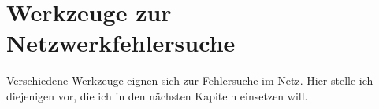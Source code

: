 \chapter{Werkzeuge zur Netzwerkfehlersuche}
\label{cha:netz-werkzeuge}

\begin{abstractsec}
  Verschiedene Werkzeuge eignen sich zur Fehlersuche im Netz. Hier stelle ich
  diejenigen vor, die ich in den nächsten Kapiteln einsetzen will.
\end{abstractsec}








